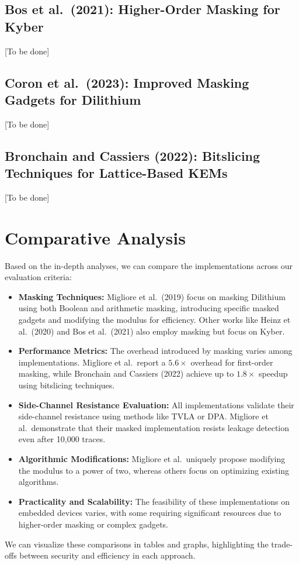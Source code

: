 \subsection{Bos et al.\ (2021): Higher-Order Masking for Kyber}

[To be done]

\subsection{Coron et al.\ (2023): Improved Masking Gadgets for Dilithium}

[To be done]

\subsection{Bronchain and Cassiers (2022): Bitslicing Techniques for Lattice-Based KEMs}

[To be done]

\section{Comparative Analysis}

Based on the in-depth analyses, we can compare the implementations across our evaluation criteria:

\begin{itemize}
    \item \textbf{Masking Techniques:} Migliore et al.\ (2019) focus on masking Dilithium using both Boolean and arithmetic masking, introducing specific masked gadgets and modifying the modulus for efficiency. Other works like Heinz et al.\ (2020) and Bos et al.\ (2021) also employ masking but focus on Kyber.
    \item \textbf{Performance Metrics:} The overhead introduced by masking varies among implementations. Migliore et al.\ report a $5.6\times$ overhead for first-order masking, while Bronchain and Cassiers (2022) achieve up to $1.8\times$ speedup using bitslicing techniques.
    \item \textbf{Side-Channel Resistance Evaluation:} All implementations validate their side-channel resistance using methods like TVLA or DPA. Migliore et al.\ demonstrate that their masked implementation resists leakage detection even after 10,000 traces.
    \item \textbf{Algorithmic Modifications:} Migliore et al.\ uniquely propose modifying the modulus to a power of two, whereas others focus on optimizing existing algorithms.
    \item \textbf{Practicality and Scalability:} The feasibility of these implementations on embedded devices varies, with some requiring significant resources due to higher-order masking or complex gadgets.
\end{itemize}

We can visualize these comparisons in tables and graphs, highlighting the trade-offs between security and efficiency in each approach.




